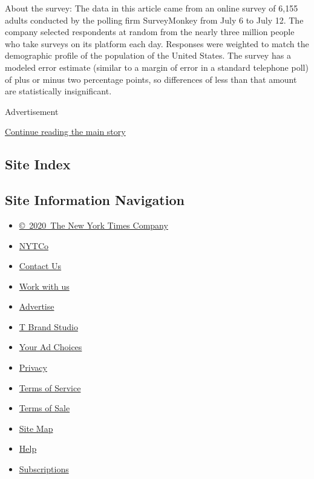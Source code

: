 About the survey: The data in this article came from an online survey of
6,155 adults conducted by the polling firm SurveyMonkey from July 6 to
July 12. The company selected respondents at random from the nearly
three million people who take surveys on its platform each day.
Responses were weighted to match the demographic profile of the
population of the United States. The survey has a modeled error estimate
(similar to a margin of error in a standard telephone poll) of plus or
minus two percentage points, so differences of less than that amount are
statistically insignificant.

Advertisement

\protect\hyperlink{after-bottom}{Continue reading the main story}

\hypertarget{site-index}{%
\subsection{Site Index}\label{site-index}}

\hypertarget{site-information-navigation}{%
\subsection{Site Information
Navigation}\label{site-information-navigation}}

\begin{itemize}
\tightlist
\item
  \href{https://help.nytimes.com/hc/en-us/articles/115014792127-Copyright-notice}{©~2020~The
  New York Times Company}
\end{itemize}

\begin{itemize}
\tightlist
\item
  \href{https://www.nytco.com/}{NYTCo}
\item
  \href{https://help.nytimes.com/hc/en-us/articles/115015385887-Contact-Us}{Contact
  Us}
\item
  \href{https://www.nytco.com/careers/}{Work with us}
\item
  \href{https://nytmediakit.com/}{Advertise}
\item
  \href{http://www.tbrandstudio.com/}{T Brand Studio}
\item
  \href{https://www.nytimes.com/privacy/cookie-policy\#how-do-i-manage-trackers}{Your
  Ad Choices}
\item
  \href{https://www.nytimes.com/privacy}{Privacy}
\item
  \href{https://help.nytimes.com/hc/en-us/articles/115014893428-Terms-of-service}{Terms
  of Service}
\item
  \href{https://help.nytimes.com/hc/en-us/articles/115014893968-Terms-of-sale}{Terms
  of Sale}
\item
  \href{https://spiderbites.nytimes.com}{Site Map}
\item
  \href{https://help.nytimes.com/hc/en-us}{Help}
\item
  \href{https://www.nytimes.com/subscription?campaignId=37WXW}{Subscriptions}
\end{itemize}
